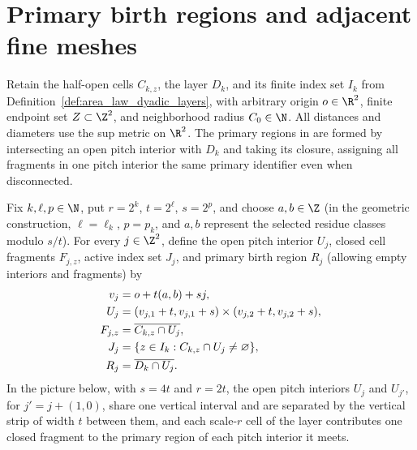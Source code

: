 \section{Primary birth regions and adjacent fine meshes}
\label{sec:area_law_primary_regions}

Retain the half-open cells $C_{k,z}$, the layer $D_k$, and its finite
index set $I_k$ from Definition~\ref{def:area_law_dyadic_layers}, with
arbitrary origin $o\in\R^2$, finite endpoint set $Z\subset\Z^2$, and
neighborhood radius $C_0\in\N$. All distances and diameters use the sup metric
on $\R^2$. The primary regions in \cite[Section~11]{OpenAI2026AreaLaw} are
formed by intersecting an open pitch interior with $D_k$ and taking its
closure, assigning all fragments in one pitch interior the same primary
identifier even when disconnected.


\begin{definition}
    \label{def:area_law_primary_regions}
    \leanok
    Fix $k,\ell,p\in\N$, put $r=2^k$, $t=2^\ell$, $s=2^p$, and choose
    $a,b\in\Z$ (in the geometric construction, $\ell=\ell_k$, $p=p_k$, and
    $a,b$ represent the selected residue classes modulo $s/t$). For every
    $j\in\Z^2$, define the open pitch interior $U_j$, closed cell fragments
    $F_{j,z}$, active index set $J_j$, and primary birth region $R_j$ (allowing
    empty interiors and fragments) by
    \begin{align}
        v_j     & =o+t(a,b)+sj,\notag                                \\
        U_j     & =(v_{j,1}+t,v_{j,1}+s)
        \times(v_{j,2}+t,v_{j,2}+s),\notag                           \\
        F_{j,z} & =\overline{C_{k,z}\cap U_j},\notag                 \\
        J_j     & =\{z\in I_k:C_{k,z}\cap U_j\ne\varnothing\},\notag \\
        R_j     & =\overline{D_k\cap U_j}.
        \label{eq:area_law_primary_regions}
    \end{align}
    In the picture below, with $s=4t$ and $r=2t$, the open pitch interiors
    $U_j$ and $U_{j'}$, for $j'=j+(1,0)$, share one vertical interval and
    are separated by the vertical strip of width $t$ between them, and each
    scale-$r$ cell of the layer
    contributes one closed fragment to the primary region of each pitch
    interior it meets.
    
\end{definition}

